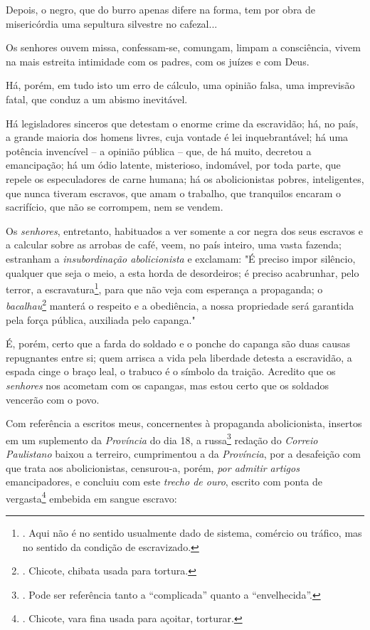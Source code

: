 Depois, o negro, que do burro apenas difere na forma, tem por obra de
misericórdia uma sepultura silvestre no cafezal...

Os senhores ouvem missa, confessam-se, comungam, limpam a consciência,
vivem na mais estreita intimidade com os padres, com os juízes e com
Deus.

Há, porém, em tudo isto um erro de cálculo, uma opinião falsa, uma
imprevisão fatal, que conduz a um abismo inevitável.

Há legisladores sinceros que detestam o enorme crime da escravidão; há,
no país, a grande maioria dos homens livres, cuja vontade é lei
inquebrantável; há uma potência invencível -- a opinião pública -- que,
de há muito, decretou a emancipação; há um ódio latente, misterioso,
indomável, por toda parte, que repele os especuladores de carne humana;
há os abolicionistas pobres, inteligentes, que nunca tiveram escravos,
que amam o trabalho, que tranquilos encaram o sacrifício, que não se
corrompem, nem se vendem.

Os \emph{senhores}, entretanto, habituados a ver somente a cor negra dos
seus escravos e a calcular sobre as arrobas de café, veem, no país
inteiro, uma vasta fazenda; estranham a \emph{insubordinação
abolicionista} e exclamam: "É preciso impor silêncio, qualquer que seja
o meio, a esta horda de desordeiros; é preciso acabrunhar, pelo terror,
a escravatura\footnote{. Aqui não é no sentido usualmente dado de
  sistema, comércio ou tráfico, mas no sentido da condição de
  escravizado.}, para que não veja com esperança a propaganda; o
\emph{bacalhau}\footnote{. Chicote, chibata usada para tortura.} manterá
o respeito e a obediência, a nossa propriedade será garantida pela força
pública, auxiliada pelo capanga."

É, porém, certo que a farda do soldado e o ponche do capanga são duas
causas repugnantes entre si; quem arrisca a vida pela liberdade detesta
a escravidão, a espada cinge o braço leal, o trabuco é o símbolo da
traição. Acredito que os \emph{senhores} nos acometam com os capangas,
mas estou certo que os soldados vencerão com o povo.

Com referência a escritos meus, concernentes à propaganda abolicionista,
insertos em um suplemento da \emph{Província} do dia 18, a
russa\footnote{. Pode ser referência tanto a ``complicada'' quanto a
  ``envelhecida''.} redação do \emph{Correio Paulistano} baixou a
terreiro, cumprimentou a da \emph{Província}, por a desafeição com que
trata aos abolicionistas, censurou-a, porém, \emph{por admitir artigos}
emancipadores, e concluiu com este \emph{trecho de ouro}, escrito com
ponta de vergasta\footnote{. Chicote, vara fina usada para açoitar,
  torturar.} embebida em sangue escravo:

